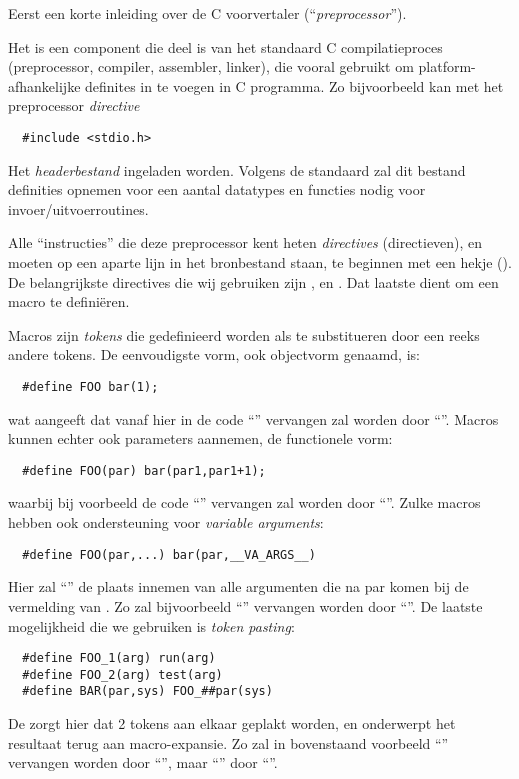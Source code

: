 Eerst een korte inleiding over de C voorvertaler (``{\em preprocessor}'').

Het is een component die deel is van het standaard C compilatieproces (preprocessor, compiler, assembler, linker), die vooral gebruikt om platform-afhankelijke definites in te voegen in C programma. Zo bijvoorbeeld kan met het preprocessor {\em directive} \begin{Verbatim}
  #include <stdio.h>
\end{Verbatim}
Het {\em headerbestand}  ingeladen worden. Volgens de standaard zal dit bestand definities opnemen voor een aantal datatypes en functies nodig voor invoer/uitvoerroutines. 

Alle ``instructies'' die deze preprocessor kent heten {\em directives} (directieven), en moeten op een aparte lijn in het bronbestand staan, te beginnen met een hekje (\code{\#}). De belangrijkste directives die wij gebruiken zijn , en . Dat laatste dient om een macro te defini\"eren.

Macros zijn {\em tokens} die gedefinieerd worden als te substitueren door een reeks andere tokens. De eenvoudigste vorm, ook objectvorm genaamd, is: \begin{Verbatim}
  #define FOO bar(1);
\end{Verbatim}
wat aangeeft dat vanaf hier in de code ``'' vervangen zal worden door ``''. Macros kunnen echter ook parameters aannemen, de functionele vorm: \begin{Verbatim}
  #define FOO(par) bar(par1,par1+1);
\end{Verbatim}
waarbij bij voorbeeld de code ``'' vervangen zal worden door ``''. Zulke macros hebben ook ondersteuning voor {\em variable arguments}: \begin{Verbatim}
  #define FOO(par,...) bar(par,__VA_ARGS__)
\end{Verbatim}
Hier zal ``'' de plaats innemen van alle argumenten die na par komen bij de vermelding van . Zo zal bijvoorbeeld ``'' vervangen worden door ``''.
De laatste mogelijkheid die we gebruiken is {\em token pasting}: \begin{Verbatim}
  #define FOO_1(arg) run(arg)
  #define FOO_2(arg) test(arg)
  #define BAR(par,sys) FOO_##par(sys)
\end{Verbatim}
De \code{\#\#} zorgt hier dat 2 tokens aan elkaar geplakt worden, en onderwerpt het resultaat terug aan macro-expansie. Zo zal in bovenstaand voorbeeld ``'' vervangen worden door ``'', maar ``'' door ``''.

